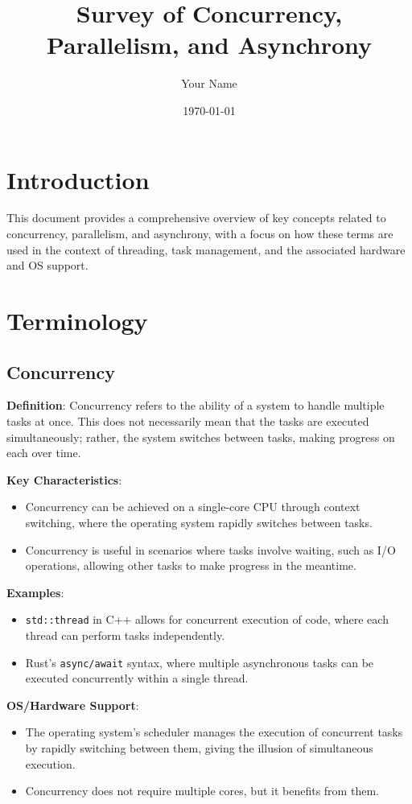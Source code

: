 \documentclass{article}
\begin{document}
\title{Survey of Concurrency, Parallelism, and Asynchrony}
\author{Your Name}
\date{\today}
\maketitle

\section*{Introduction}
This document provides a comprehensive overview of key concepts related to concurrency, parallelism, and asynchrony, with a focus on how these terms are used in the context of threading, task management, and the associated hardware and OS support.

\section*{Terminology}

\subsection*{Concurrency}
\textbf{Definition}: Concurrency refers to the ability of a system to handle multiple tasks at once. This does not necessarily mean that the tasks are executed simultaneously; rather, the system switches between tasks, making progress on each over time.

\textbf{Key Characteristics}:
\begin{itemize}
    \item Concurrency can be achieved on a single-core CPU through context switching, where the operating system rapidly switches between tasks.
    \item Concurrency is useful in scenarios where tasks involve waiting, such as I/O operations, allowing other tasks to make progress in the meantime.
\end{itemize}

\textbf{Examples}:
\begin{itemize}
    \item \texttt{std::thread} in C++ allows for concurrent execution of code, where each thread can perform tasks independently.
    \item Rust's \texttt{async/await} syntax, where multiple asynchronous tasks can be executed concurrently within a single thread.
\end{itemize}

\textbf{OS/Hardware Support}:
\begin{itemize}
    \item The operating system's scheduler manages the execution of concurrent tasks by rapidly switching between them, giving the illusion of simultaneous execution.
    \item Concurrency does not require multiple cores, but it benefits from them.
\end{itemize}
\end{document}
